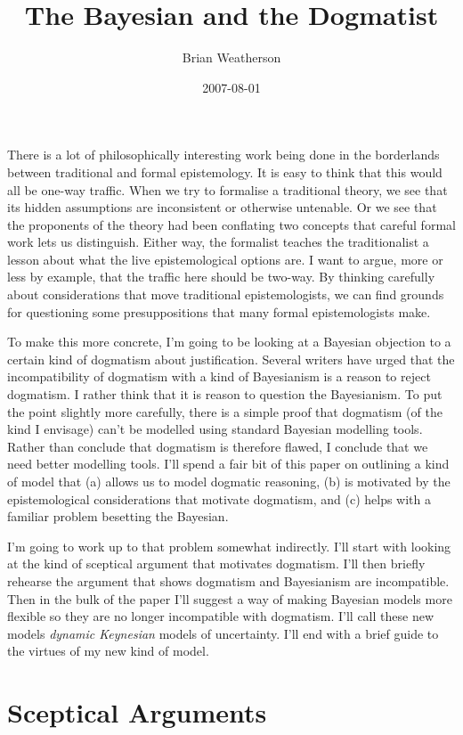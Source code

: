 \documentclass[
  11pt,
  letterpaper,
  DIV=11,
  numbers=noendperiod,
  oneside]{scrartcl}
\title{The Bayesian and the Dogmatist}
\author{Brian Weatherson}
\date{2007-08-01}
\begin{document}
\maketitle
There is a lot of philosophically interesting work being done in the
borderlands between traditional and formal epistemology. It is easy to
think that this would all be one-way traffic. When we try to formalise a
traditional theory, we see that its hidden assumptions are inconsistent
or otherwise untenable. Or we see that the proponents of the theory had
been conflating two concepts that careful formal work lets us
distinguish. Either way, the formalist teaches the traditionalist a
lesson about what the live epistemological options are. I want to argue,
more or less by example, that the traffic here should be two-way. By
thinking carefully about considerations that move traditional
epistemologists, we can find grounds for questioning some
presuppositions that many formal epistemologists make.

To make this more concrete, I'm going to be looking at a Bayesian
objection to a certain kind of dogmatism about justification. Several
writers have urged that the incompatibility of dogmatism with a kind of
Bayesianism is a reason to reject dogmatism. I rather think that it is
reason to question the Bayesianism. To put the point slightly more
carefully, there is a simple proof that dogmatism (of the kind I
envisage) can't be modelled using standard Bayesian modelling tools.
Rather than conclude that dogmatism is therefore flawed, I conclude that
we need better modelling tools. I'll spend a fair bit of this paper on
outlining a kind of model that (a) allows us to model dogmatic
reasoning, (b) is motivated by the epistemological considerations that
motivate dogmatism, and (c) helps with a familiar problem besetting the
Bayesian.

I'm going to work up to that problem somewhat indirectly. I'll start
with looking at the kind of sceptical argument that motivates dogmatism.
I'll then briefly rehearse the argument that shows dogmatism and
Bayesianism are incompatible. Then in the bulk of the paper I'll suggest
a way of making Bayesian models more flexible so they are no longer
incompatible with dogmatism. I'll call these new models \emph{dynamic
Keynesian} models of uncertainty. I'll end with a brief guide to the
virtues of my new kind of model.

\section{Sceptical Arguments}\label{sceptical-arguments}
\end{document}
